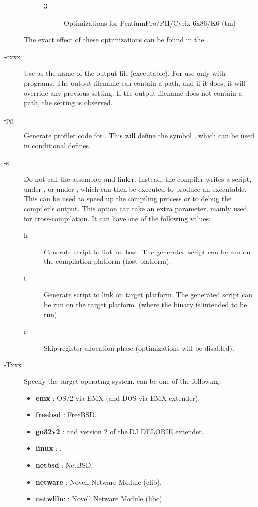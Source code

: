 \begin{description}
\begin{description}
\begin{description}
\item[3] Optimizations for PentiumPro/PII/Cyrix 6x86/K6 (tm)
\end{description}
\end{description}
The exact effect of these optimizations can be found in the \progref.
\item [-oxxx]  Use  as the name of the output
file (executable). For use only with programs. The output filename can contain a
path, and if it does, it will override any previous  setting. If
the output filename does not contain a path, the  setting is
observed.
\item [-pg]  Generate profiler code for . This will
define the symbol , which can be used in conditional
defines.
\item [-s]  Do not call the assembler and linker.
Instead, the compiler writes a script,  under \dos, or
 under \linux, which can then be executed to produce an
executable. This can be used to speed up the compiling process or to debug
the compiler's output. This option can take an extra parameter, mainly
used for cross-compilation. It can have one of the following values:
\begin{description}
\item[h] Generate script to link on host. The generated script can be run on
the compilation platform (host platform).
\item[t] Generate script to link on target platform. The generated script
can be run on the target platform. (where the binary is intended to be run)
\item[r] Skip register allocation phase (optimizations will be disabled).
\end{description}
\item[-Txxx]  Specify the target operating system.  can be one of
the following:
\begin{itemize}
\item \textbf{emx} : OS/2 via EMX (and DOS via EMX extender).
\item \textbf{freebsd} : FreeBSD.
\item \textbf{go32v2} : \dos and version 2 of the DJ DELORIE extender.
\item \textbf{linux} : \linux.
\item \textbf{netbsd} : NetBSD.
\item \textbf{netware} : Novell Netware Module (clib).
\item \textbf{netwlibc} : Novell Netware Module (libc).

\end{itemize}
\end{description}
